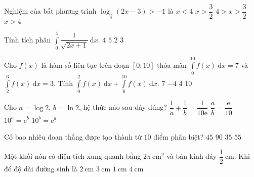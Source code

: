 \begin{ex}%
Nghiệm của bất phương trình $\log_{\frac{1}{5}} (2x-3) >-1$ là
\choice
{$x<4$}
{$x>\dfrac{3}{2}$}
{\True $4>x>\dfrac{3}{2}$}
{$x>4$}
\end{ex}

\begin{ex}%
Tính tích phân $\displaystyle \int\limits_0^4 \dfrac{1}{\sqrt{2x+1}}~ \mathrm{d}x$.
\choice
{$4$}
{$5$}
{\True $2$}
{$3$}
\end{ex}

\begin{ex}%
Cho $f(x)$ là hàm số liên tục trên đoạn $[0;10]$ thỏa mãn $\displaystyle \int\limits_0^{10} f(x) ~ \mathrm{d}x=7$ và $\displaystyle \int\limits_2^6 f(x) ~ \mathrm{d}x =3$. Tính $\displaystyle \int\limits_0^2 f(x) ~ \mathrm{d}x + \int\limits_6^{10} f(x) ~ \mathrm{d}x$.
\choice
{$7$}
{$-4$}
{\True $4$}
{$10$}
\end{ex}

\begin{ex}%
Cho $a=\log 2$, $b=\ln 2$, hệ thức nào sau đây đúng?
\choice
{$\dfrac{1}{a} + \dfrac{1}{b} = \dfrac{1}{10\mathrm{e}}$}
{$\dfrac{a}{b} = \dfrac{\mathrm{e}}{10}$}
{\True $10^a =\mathrm{e}^b$}
{$10^b =\mathrm{e}^a$}
\end{ex}

\begin{ex}%
Có bao nhiêu đoạn thẳng được tạo thành từ $10$ điểm phân biệt?
\choice
{\True $45$}
{$90$}
{$35$}
{$55$}
\end{ex}

\begin{ex}%
Một khối nón có diện tích xung quanh bằng $2\pi~\mathrm{cm^2}$ và bán kính đáy $\dfrac{1}{2} ~\mathrm{cm}$. Khi đó độ dài đường sinh là
\choice
{$2~\mathrm{cm}$}
{$3~\mathrm{cm}$}
{$1 ~\mathrm{cm}$}
{\True $4 ~\mathrm{cm}$}
\end{ex}

